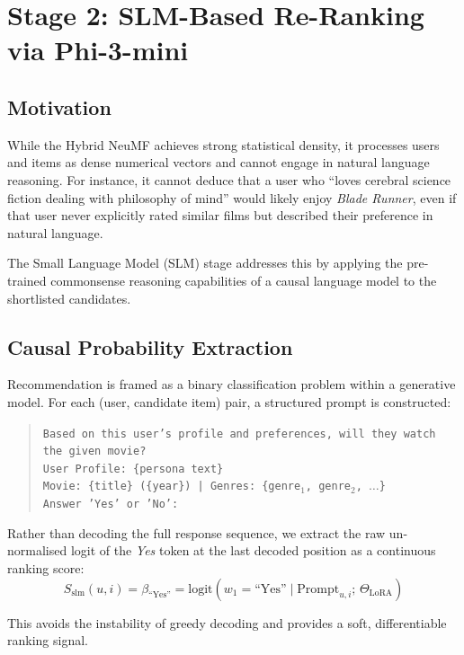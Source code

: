 \documentclass[11pt,a4paper]{article}
\begin{document}
\section{Stage 2: SLM-Based Re-Ranking via Phi-3-mini}

\subsection{Motivation}
While the Hybrid NeuMF achieves strong statistical density, it processes users and items as dense numerical vectors and cannot engage in natural language reasoning. For instance, it cannot deduce that a user who ``loves cerebral science fiction dealing with philosophy of mind'' would likely enjoy \textit{Blade Runner}, even if that user never explicitly rated similar films but described their preference in natural language.

The Small Language Model (SLM) stage addresses this by applying the pre-trained commonsense reasoning capabilities of a causal language model to the shortlisted candidates.

\subsection{Causal Probability Extraction}
Recommendation is framed as a binary classification problem within a generative model. For each (user, candidate item) pair, a structured prompt is constructed:

\begin{quote}
\texttt{Based on this user's profile and preferences, will they watch the given movie?}\\
\texttt{User Profile: \{persona text\}}\\
\texttt{Movie: \{title\} (\{year\}) | Genres: \{genre$_1$, genre$_2$, $\ldots$\}}\\
\texttt{Answer 'Yes' or 'No':}
\end{quote}

Rather than decoding the full response sequence, we extract the raw un-normalised logit of the \textit{Yes} token at the last decoded position as a continuous ranking score:
\begin{equation}
  S_{\text{slm}}(u,i) = \beta_{\text{``Yes''}} = \text{logit}(w_1 = \text{``Yes''} \mid \text{Prompt}_{u,i};\,\Theta_{\text{LoRA}})
\end{equation}

This avoids the instability of greedy decoding and provides a soft, differentiable ranking signal.
\end{document}
